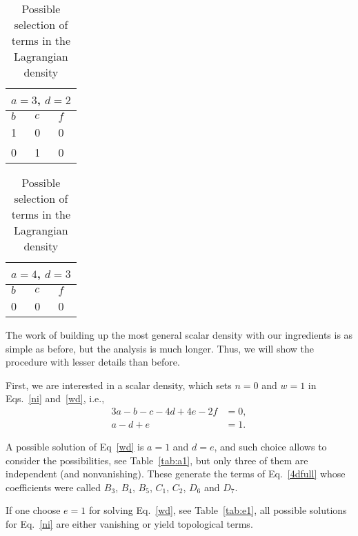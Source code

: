 \begin{table}[t]
  \caption{Possible selection of terms in the Lagrangian density}
  \label{tab:a3}
  \begin{tabular}{|p{}p{}p{}|}
    \hline
    \multicolumn{3}{|c|}{$a=3$, $d=2$} \\
    \hline
    $b$ & $c$ & $f$ \\
    \hline
    1 & 0 & 0 \\
    0 & 1 & 0 \\
    \hline
  \end{tabular}
\end{table}

\begin{table}[t]
  \caption{Possible selection of terms in the Lagrangian density}
  \label{tab:a4}
  \begin{tabular}{|p{}p{}p{}|}
    \hline
    \multicolumn{3}{|c|}{$a=4$, $d=3$} \\
    \hline
    $b$ & $c$ & $f$ \\
    \hline
    0 & 0 & 0 \\
    \hline
  \end{tabular}
\end{table}


The work of building up the most general scalar density with our ingredients is as simple as before, but the analysis is much longer. Thus, we will show the procedure with lesser details than before.

First, we are interested in a scalar density, which sets $n = 0$ and $w = 1$ in Eqs.~\eqref{ni} and~\eqref{wd}, i.e.,
\begin{align}
  3a -b -c - 4d +4e - 2f &= 0, \\
  a - d + e &= 1.
\end{align}

A possible solution of Eq~\eqref{wd} is $a=1$ and $d=e$, and such choice allows to consider the possibilities, see Table~\ref{tab:a1}, but only three of them are independent (and nonvanishing). These generate the terms of Eq.~\eqref{4dfull} whose coefficients were called $B_3$, $B_4$, $B_5$, $C_1$, $C_2$, $D_6$ and $D_7$.

If one choose $e=1$ for solving Eq.~\eqref{wd}, see Table~\ref{tab:e1}, all possible solutions for Eq.~\eqref{ni} are either vanishing or yield topological terms.

